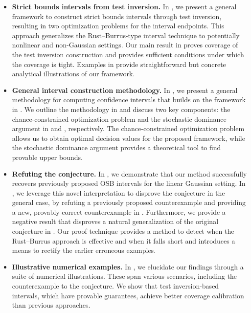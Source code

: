 \documentclass[11pt]{article}
\numberwithin{equation}{section}
\numberwithin{figure}{section}
\begin{document}
\begin{itemize}[leftmargin=7mm]
    \item[(1)]
    \textbf{Strict bounds intervals from test inversion.}
    In , we present a general framework to construct strict bounds intervals through test inversion, resulting in two optimization problems for the interval endpoints. 
    This approach generalizes the Rust--Burrus-type interval technique to potentially nonlinear and non-Gaussian settings. 
    Our main result in  proves coverage of the test inversion construction and  provides sufficient conditions under which the coverage is tight. 
    Examples in  provide straightforward but concrete analytical illustrations of our framework.
 
    \item[(2)]
    \textbf{General interval construction methodology.}
    In , we present a general methodology for computing confidence intervals that builds on the framework in .
    We outline the methodology in  and discuss two key components: the chance-constrained optimization problem and the stochastic dominance argument in  and , respectively.
    The chance-constrained optimization problem allows us to obtain optimal decision values for the proposed framework, while the stochastic dominance argument provides a theoretical tool to find provable upper bounds.
    
    \item[(3)]
    \textbf{Refuting the \rustburrus conjecture.}
    In , we demonstrate that our method successfully recovers previously proposed OSB intervals for the linear Gaussian setting. 
    In , we leverage this novel interpretation to disprove the \rustburrus conjecture \cite{rust_burrus, rust1994confidence} in the general case, by refuting a previously proposed counterexample and providing a new, provably correct counterexample in . 
    Furthermore, we provide a negative result that disproves a natural generalization of the original conjecture in . 
    Our proof technique provides a method to detect when the Rust--Burrus approach is effective and when it falls short and introduces a means to rectify the earlier erroneous examples. 

    \item[(4)]
    \textbf{Illustrative numerical examples.}
    In , we elucidate our findings through a suite of numerical illustrations. 
    These span various scenarios, including the counterexample to the \rustburrus conjecture. 
    We show that test inversion-based intervals, which have provable guarantees, achieve better coverage calibration than previous approaches.
\end{itemize}
\end{document}
